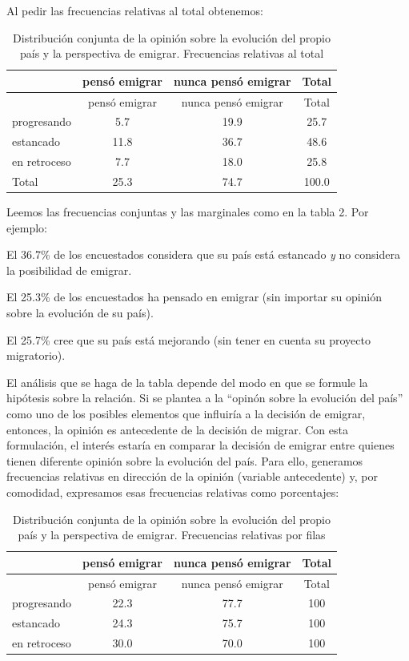 \documentclass[]{book}
\begin{document}
Al pedir las frecuencias relativas al total obtenemos:

\begin{longtable}[]{@{}lccc@{}}
\caption{\label{tab:rel}Distribución conjunta de la opinión sobre la evolución del propio país y la perspectiva de emigrar. Frecuencias relativas al total}\tabularnewline
\toprule
& pensó emigrar & nunca pensó emigrar & Total\tabularnewline
\midrule
\endfirsthead
\toprule
& pensó emigrar & nunca pensó emigrar & Total\tabularnewline
\midrule
\endhead
progresando & 5.7 & 19.9 & 25.7\tabularnewline
estancado & 11.8 & 36.7 & 48.6\tabularnewline
en retroceso & 7.7 & 18.0 & 25.8\tabularnewline
Total & 25.3 & 74.7 & 100.0\tabularnewline
\bottomrule
\end{longtable}

Leemos las frecuencias conjuntas y las marginales como en la tabla 2.
Por ejemplo:

El 36.7\% de los encuestados considera que su país está estancado \emph{y} no considera la posibilidad de emigrar.

El 25.3\% de los encuestados ha pensado en emigrar (sin importar su opinión sobre la evolución de su país).

El 25.7\% cree que su país está mejorando (sin tener en cuenta su proyecto migratorio).

El análisis que se haga de la tabla depende del modo en que se formule la hipótesis sobre la relación. Si se plantea a la ``opinón sobre la evolución del país'' como uno de los posibles elementos que influiría a la decisión de emigrar, entonces, la opinión es antecedente de la decisión de migrar. Con esta formulación, el interés estaría en comparar la decisión de emigrar entre quienes tienen diferente opinión sobre la evolución del país. Para ello, generamos frecuencias relativas en dirección de la opinión (variable antecedente) y, por comodidad, expresamos esas frecuencias relativas como porcentajes:

\begin{longtable}[]{@{}lccc@{}}
\caption{\label{tab:unnamed-chunk-116}Distribución conjunta de la opinión sobre la evolución del propio país y la perspectiva de emigrar. Frecuencias relativas por filas}\tabularnewline
\toprule
& pensó emigrar & nunca pensó emigrar & Total\tabularnewline
\midrule
\endfirsthead
\toprule
& pensó emigrar & nunca pensó emigrar & Total\tabularnewline
\midrule
\endhead
progresando & 22.3 & 77.7 & 100\tabularnewline
estancado & 24.3 & 75.7 & 100\tabularnewline
en retroceso & 30.0 & 70.0 & 100\tabularnewline
\bottomrule
\end{longtable}
\end{document}
